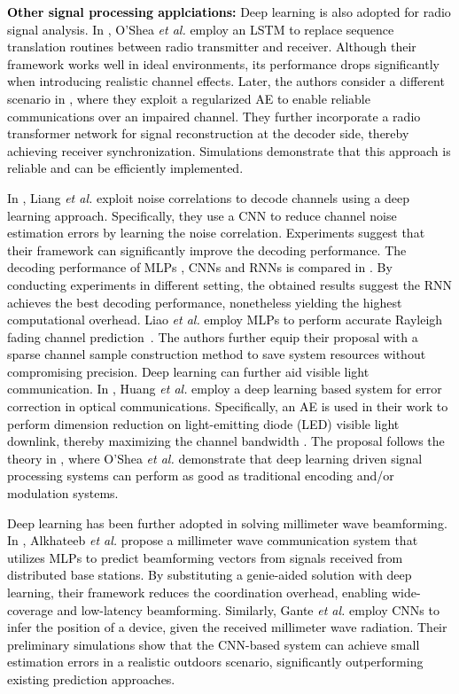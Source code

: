 \documentclass[journal,comsoc,letter]{IEEEtran}
\newcommand{\edit}[1]{\textcolor{black}{#1}}
\newcommand{\rev}[1]{\textcolor{black}{#1}}
\begin{document}
\noindent\edit{\textbf{Other signal processing applciations:} Deep learning is also adopted for radio signal analysis. In \cite{o2016end}, O'Shea \emph{et al.} employ an LSTM to replace sequence translation routines between radio transmitter and receiver. Although their framework works well in ideal environments, its performance drops significantly when introducing realistic channel effects. Later, the authors consider a different scenario in \cite{o2016learning}, where they exploit a regularized AE to enable reliable communications over an impaired channel. They further incorporate a radio transformer network for signal reconstruction at the decoder side, thereby achieving receiver synchronization. Simulations demonstrate that this approach is reliable and can be efficiently implemented.} 

\edit{In \cite{liang2018exploiting}, Liang \emph{et al.} exploit noise correlations to decode channels using a deep learning approach.  Specifically, they use a CNN to reduce channel noise estimation errors by learning the noise correlation. Experiments suggest that their framework can significantly improve the decoding performance. The decoding performance of MLPs , CNNs and RNNs is compared in \cite{lyu2018performance}. By conducting experiments in different setting, the obtained results suggest the RNN achieves the best decoding performance, nonetheless yielding the highest computational overhead.} \rev{Liao \emph{et al.} employ MLPs to perform accurate Rayleigh fading channel prediction~\cite{liao2018rayleigh}. The authors further equip their proposal with a sparse channel sample construction method to save system resources without compromising precision. Deep learning can further aid visible light communication. In \cite{huang2018fully}, Huang \emph{et al.} employ a deep learning based system for error correction in optical communications. Specifically, an AE is used in their work to perform dimension reduction on light-emitting diode (LED) visible light downlink, thereby maximizing the channel bandwidth . The proposal follows the theory in \cite{timothy2017introduction}, where O'Shea \emph{et al.} demonstrate that deep learning driven signal processing systems can perform as good as traditional encoding and/or modulation systems. }

\rev{Deep learning has been further adopted in solving millimeter wave beamforming. In \cite{alkhateeb2018deep}, Alkhateeb \emph{et al.} propose a millimeter wave communication system that utilizes MLPs to predict beamforming vectors from signals received from distributed base stations. By substituting a genie-aided solution with deep learning, their framework reduces the coordination overhead, enabling wide-coverage and low-latency beamforming. Similarly, Gante \emph{et al.} employ CNNs to infer the position of a device, given the received millimeter wave radiation. Their preliminary simulations show that the CNN-based system can achieve small estimation errors in a realistic outdoors scenario, significantly outperforming existing prediction approaches.}\\
\end{document}
